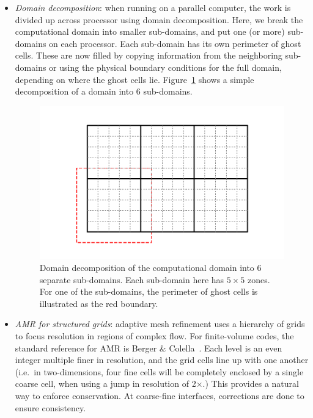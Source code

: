 \begin{itemize}

\item {\em Domain decomposition}: when running on a parallel computer,
 the work is divided up across processor using domain decomposition.
 Here, we break the computational domain into smaller sub-domains, and
 put one (or more) sub-domains on each processor.  Each sub-domain
 has its own perimeter of ghost cells.  These are now filled by copying
 information from the neighboring sub-domains or using the physical
 boundary conditions for the full domain, depending on where the 
 ghost cells lie.  Figure~\ref{fig:domain} shows a simple decomposition of
 a domain into 6 sub-domains.

 \begin{figure}
 \centering
 \includegraphics{domain}
 \caption{\label{fig:domain} Domain decomposition of the computational
   domain into 6 separate sub-domains.  Each sub-domain here has
   $5\times 5$ zones.  For one of the sub-domains, the perimeter of
   ghost cells is illustrated as the red boundary.}
 \end{figure}

\item {\em AMR for structured grids}: adaptive mesh refinement uses a
  hierarchy of grids to focus resolution in regions of complex flow.
  For finite-volume codes, the standard reference for AMR is Berger \&
  Colella~\cite{berger-colella}.  Each level is an even integer
  multiple finer in resolution, and the grid cells line up with one
  another (i.e.\ in two-dimensions, four fine cells will be completely
  enclosed by a single coarse cell, when using a jump in resolution of
  2$\times$.)  This provides a natural way to enforce conservation.
  At coarse-fine interfaces, corrections are done to ensure
  consistency.

\end{itemize}
